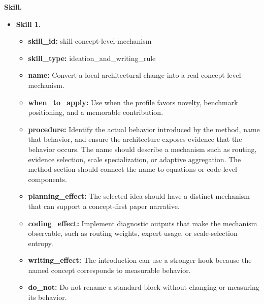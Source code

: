 \documentclass{opendatalab}
\begin{document}
\begin{tcolorbox}
\textbf{Skill.}
\begin{itemize}\setlength\itemsep{2pt}
  \item \textbf{Skill 1.}
  \begin{itemize}\setlength\itemsep{1pt}
    \item \textbf{skill\_id:} skill-concept-level-mechanism
    \item \textbf{skill\_type:} ideation\_and\_writing\_rule
    \item \textbf{name:} Convert a local architectural change into a real concept-level mechanism.
    \item \textbf{when\_to\_apply:} Use when the profile favors novelty, benchmark positioning, and a memorable contribution.
    \item \textbf{procedure:} Identify the actual behavior introduced by the method, name that behavior, and ensure the architecture exposes evidence that the behavior occurs. The name should describe a mechanism such as routing, evidence selection, scale specialization, or adaptive aggregation. The method section should connect the name to equations or code-level components.
    \item \textbf{planning\_effect:} The selected idea should have a distinct mechanism that can support a concept-first paper narrative.
    \item \textbf{coding\_effect:} Implement diagnostic outputs that make the mechanism observable, such as routing weights, expert usage, or scale-selection entropy.
    \item \textbf{writing\_effect:} The introduction can use a stronger hook because the named concept corresponds to measurable behavior.
    \item \textbf{do\_not:} Do not rename a standard block without changing or measuring its behavior.
  \end{itemize}


\end{itemize}
\end{tcolorbox}
\end{document}

